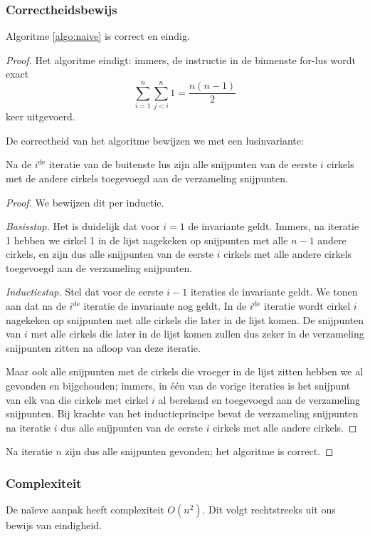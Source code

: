\subsubsection{Correctheidsbewijs}
\begin{stl} Algoritme \ref{algo:naive} is correct en eindig.\end{stl}
\begin{proof}
Het algoritme eindigt: immers, de instructie in de binnenste for-lus
wordt exact \[\sum_{i=1}^{n} \sum_{j<i}^{n} 1 = \frac{n(n-1)}{2} \]
keer uitgevoerd. 

De correctheid van het algoritme bewijzen we met een lusinvariante:
\begin{inv} 
Na de $i^{\textrm{de}}$ iteratie van de buitenste lus zijn
alle snijpunten van de eerste $i$ cirkels met de andere cirkels
toegevoegd aan de verzameling snijpunten.
\end{inv} 

\begin{proof}
We bewijzen dit per inductie.

\textit{Basisstap.} Het is duidelijk dat voor $i = 1$ de invariante
geldt. Immers, na iteratie 1 hebben we cirkel 1 in de lijst nagekeken
op snijpunten met alle $n-1$ andere cirkels, en zijn dus alle
snijpunten van de eerste $i$ cirkels met alle andere cirkels
toegevoegd aan de verzameling snijpunten.

\textit{Inductiestap.} Stel dat voor de eerste $i - 1$ iteraties de
invariante geldt. We tonen aan dat na de $i^{\textrm{de}}$
iteratie de invariante nog geldt. In de $i^{\textrm{de}}$ iteratie
wordt cirkel $i$ nagekeken op snijpunten met alle cirkels die later in
de lijst komen. De snijpunten van $i$ met alle cirkels die later in de
lijst komen zullen dus zeker in de verzameling snijpunten zitten na
afloop van deze iteratie. 

Maar ook alle snijpunten met de cirkels die vroeger in de lijst zitten
hebben we al gevonden en bijgehouden; immers, in \'e\'en van de vorige
iteraties is het snijpunt van elk van die cirkels met cirkel $i$ al
berekend en toegevoegd aan de verzameling snijpunten. Bij krachte van
het inductieprincipe bevat de verzameling snijpunten na iteratie $i$
dus alle snijpunten van de eerste $i$ cirkels met alle andere
cirkels. 
\end{proof}

Na iteratie $n$ zijn dus alle snijpunten gevonden; het algoritme is correct.
\end{proof}

\subsubsection{Complexiteit}
De na\"ieve aanpak heeft complexiteit $O(n^2)$. Dit volgt rechtstreeks uit ons bewijs van eindigheid.


